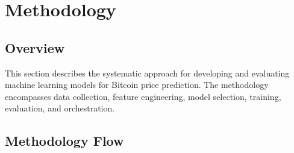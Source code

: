 \chapter{Methodology}
\label{ch:methodology}

\section{Overview}

This section describes the systematic approach for developing and evaluating machine learning models for Bitcoin price prediction. The methodology encompasses data collection, feature engineering, model selection, training, evaluation, and orchestration.

\section{Methodology Flow}

